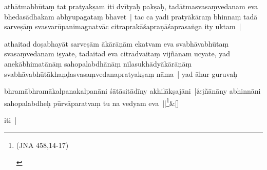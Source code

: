 \documentclass[article,a4paper]{memoir}
\begin{document}
	  \pstart athā\-tmabhū\-taṃ tat pratyakṣam iti dvī\-tyaḥ pakṣaḥ, tadā\-tmasvasaṃvedanam eva bhedasā\-dhakam abhyupagataṃ bhavet | tac ca yadi pratyā\-kā\-raṃ bhinnaṃ tadā\- sarveṣā\-ṃ svasvarū\-panimagnatvā\-c citraprakā\-śapraṇā\-śaprasaṅga ity uktam |
	\pend
      

	  \pstart athaitad doṣabhayā\-t sarveṣā\-m ā\-kā\-rā\-ṇā\-m ekatvam eva svabhā\-vabhū\-taṃ svasaṃvedanam iṣyate, tadaitad eva citrā\-dvaitaṃ vijñā\-nam ucyate, yad anekā\-bhimatā\-nā\-ṃ sahopalabdhā\-nā\-ṃ nī\-lasukhā\-dyā\-kā\-rā\-ṇā\-ṃ svabhā\-vabhū\-tā\-khaṇḍasvasaṃvedanapratyakṣaṃ nā\-ma | yad ā\-hur guruvaḥ
	\pend
      
	    
	    \stanza[\smallbreak]
bhramā\-bhramā\-kalpanakalpanā\-ni śā\-tā\-sitā\-dī\-ny akhilā\-kṣajā\-ni |&jñā\-nā\-ny abhinnā\-ni sahopalabdheḥ pū\-rvā\-paratvaṃ tu na vedyam eva ||\footnote{\begin{english}(JNA 458,14-17)\end{english}}\&[\smallbreak]


	

	  \pstart iti |
	\pend
      
\end{document}
